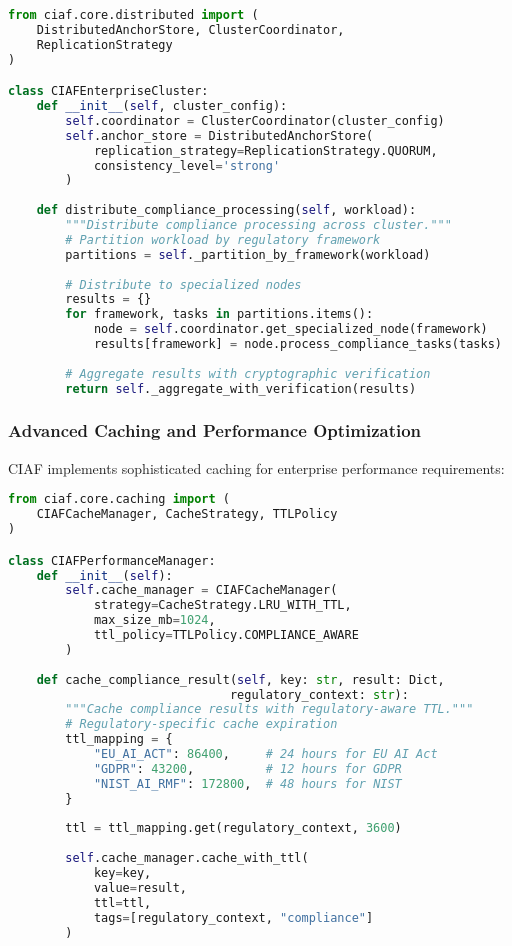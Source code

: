 \documentclass[12pt,a4paper]{article}
\begin{document}
\begin{lstlisting}[language=Python, caption=Distributed Processing Implementation]
from ciaf.core.distributed import (
    DistributedAnchorStore, ClusterCoordinator, 
    ReplicationStrategy
)

class CIAFEnterpriseCluster:
    def __init__(self, cluster_config):
        self.coordinator = ClusterCoordinator(cluster_config)
        self.anchor_store = DistributedAnchorStore(
            replication_strategy=ReplicationStrategy.QUORUM,
            consistency_level='strong'
        )
    
    def distribute_compliance_processing(self, workload):
        """Distribute compliance processing across cluster."""
        # Partition workload by regulatory framework
        partitions = self._partition_by_framework(workload)
        
        # Distribute to specialized nodes
        results = {}
        for framework, tasks in partitions.items():
            node = self.coordinator.get_specialized_node(framework)
            results[framework] = node.process_compliance_tasks(tasks)
        
        # Aggregate results with cryptographic verification
        return self._aggregate_with_verification(results)
\end{lstlisting}

\subsubsection{Advanced Caching and Performance Optimization}

CIAF implements sophisticated caching for enterprise performance requirements:

\begin{lstlisting}[language=Python, caption=Performance Optimization System]
from ciaf.core.caching import (
    CIAFCacheManager, CacheStrategy, TTLPolicy
)

class CIAFPerformanceManager:
    def __init__(self):
        self.cache_manager = CIAFCacheManager(
            strategy=CacheStrategy.LRU_WITH_TTL,
            max_size_mb=1024,
            ttl_policy=TTLPolicy.COMPLIANCE_AWARE
        )
    
    def cache_compliance_result(self, key: str, result: Dict, 
                               regulatory_context: str):
        """Cache compliance results with regulatory-aware TTL."""
        # Regulatory-specific cache expiration
        ttl_mapping = {
            "EU_AI_ACT": 86400,     # 24 hours for EU AI Act
            "GDPR": 43200,          # 12 hours for GDPR
            "NIST_AI_RMF": 172800,  # 48 hours for NIST
        }
        
        ttl = ttl_mapping.get(regulatory_context, 3600)
        
        self.cache_manager.cache_with_ttl(
            key=key,
            value=result,
            ttl=ttl,
            tags=[regulatory_context, "compliance"]
        )
\end{lstlisting}
\end{document}
